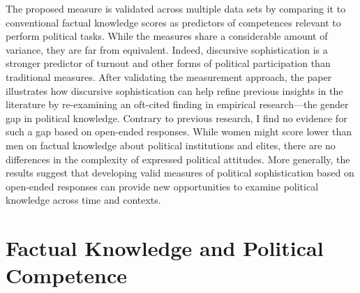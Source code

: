 \documentclass[12pt]{article}
\begin{document}
The proposed measure is validated across multiple data sets by comparing it to conventional factual knowledge scores as predictors of competences relevant to perform political tasks. While the measures share a considerable amount of variance, they are far from equivalent. Indeed, discursive sophistication is a stronger predictor of turnout and other forms of political participation than traditional measures. After validating the measurement approach, the paper illustrates how discursive sophistication can help refine previous insights in the literature by re-examining an oft-cited finding in empirical research---the gender gap in political knowledge. Contrary to previous research, I find no evidence for such a gap based on open-ended responses. While women might score lower than men on factual knowledge about political institutions and elites, there are no differences in the complexity of expressed political attitudes. More generally, the results suggest that developing valid measures of political sophistication based on open-ended responses can provide new opportunities to examine political knowledge across time and contexts. 


\section*{Factual Knowledge and Political Competence}

\end{document}
